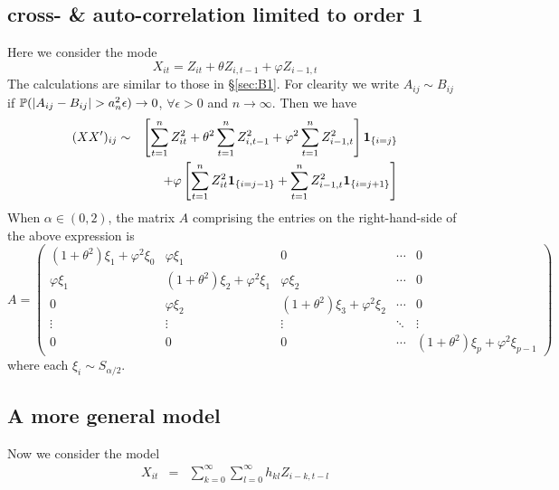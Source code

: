 \documentclass{article}
\begin{document}
\subsection{cross- \& auto-correlation limited to order 1}
Here we consider the mode
\[
X_{it} = Z_{it} + \theta Z_{i, t-1} + \varphi Z_{i-1, t}
\]
The calculations are similar to those in \S\ref{sec:B1}. For clearity
we write $A_{ij} \sim B_{ij}$ if $\P(|A_{ij} - B_{ij}| > a_n^2 \epsilon)
\to 0$, $\forall \epsilon > 0$ and $n \to \infty$. Then we have
\begin{eqnarray*}
  (XX')_{ij} &\sim& \left[
    \sum_{t=1}^n Z_{it}^2 + \theta^2 \sum_{t=1}^n Z_{i,t-1}^2 +
    \varphi^2 \sum_{t=1}^n Z_{i-1,t}^2 
  \right]\I{i=j} \\
  && + \varphi \left[
    \sum_{t=1}^n Z_{it}^2 \I{i=j-1} + \sum_{t=1}^n Z_{i-1, t}^2 \I{i=j+1}
  \right]
\end{eqnarray*}
When $\alpha \in (0,2)$, the matrix $A$ comprising the entries on the
right-hand-side of the above expression is
\[
A =
\begin{pmatrix}
  (1 + \theta^2)\xi_1 + \varphi^2 \xi_0 & \varphi \xi_1 & 0 & \cdots & 0 \\
  \varphi \xi_1 & (1 + \theta^2)\xi_2 + \varphi^2 \xi_1 & \varphi \xi_2 & \cdots & 0 \\
  0 & \varphi \xi_2 & (1 + \theta^2)\xi_3 + \varphi^2 \xi_2 & \cdots & 0 \\
  \vdots & \vdots & \vdots & \ddots & \vdots \\
  0 & 0 & 0 & \cdots & (1 + \theta^2)\xi_p + \varphi^2 \xi_{p-1}
\end{pmatrix}
\]
where each $\xi_i \sim S_{\alpha/2}$.

\subsection{A more general model}\label{sec:GeneralModel}
Now we consider the model
\begin{eqnarray*}
  X_{it} &=& \sum_{k=0}^\infty \sum_{l=0}^\infty h_{kl} Z_{i-k,t-l}
\end{eqnarray*}
\end{document}
